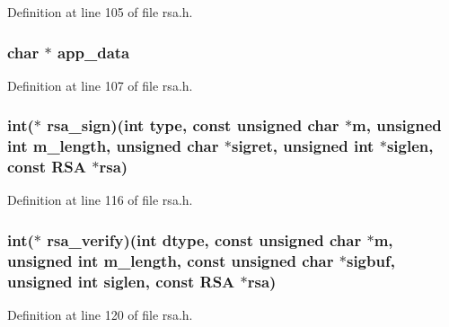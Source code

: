 Definition at line 105 of file rsa.\+h.

\subsubsection[{\texorpdfstring{app\+\_\+data}{app_data}}]{\setlength{\rightskip}{0pt plus 5cm}char $\ast$ app\+\_\+data}\hypertarget{structrsa__meth__st_adc165d2dbd917509babcf4bcce182a13}{}\label{structrsa__meth__st_adc165d2dbd917509babcf4bcce182a13}


Definition at line 107 of file rsa.\+h.

\subsubsection[{\texorpdfstring{rsa\+\_\+sign}{rsa_sign}}]{\setlength{\rightskip}{0pt plus 5cm}int($\ast$ rsa\+\_\+sign)(int {\bf type}, const unsigned char $\ast$m, unsigned int m\+\_\+length, unsigned char $\ast$sigret, unsigned int $\ast$siglen, const {\bf R\+SA} $\ast$rsa)}\hypertarget{structrsa__meth__st_aed7bc1da03d0351f8cfeb4f071d156bd}{}\label{structrsa__meth__st_aed7bc1da03d0351f8cfeb4f071d156bd}


Definition at line 116 of file rsa.\+h.

\subsubsection[{\texorpdfstring{rsa\+\_\+verify}{rsa_verify}}]{\setlength{\rightskip}{0pt plus 5cm}int($\ast$ rsa\+\_\+verify)(int dtype, const unsigned char $\ast$m, unsigned int m\+\_\+length, const unsigned char $\ast$sigbuf, unsigned int siglen, const {\bf R\+SA} $\ast$rsa)}\hypertarget{structrsa__meth__st_aad7b0a7e64b34eb1fbc49d6149d1e1de}{}\label{structrsa__meth__st_aad7b0a7e64b34eb1fbc49d6149d1e1de}


Definition at line 120 of file rsa.\+h.

